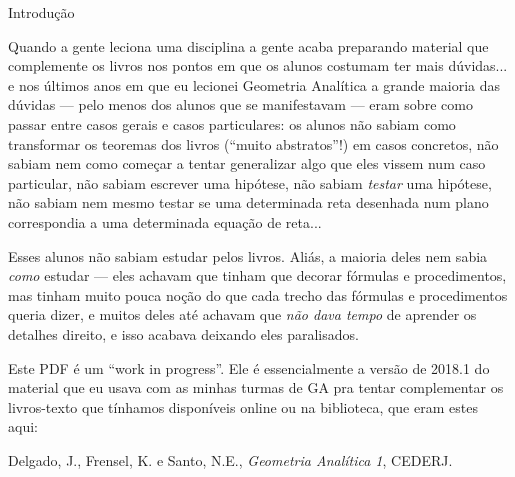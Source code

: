 \documentclass[oneside]{book}
\begin{document}
\newpage


%                                                      


 {Introdução}





Quando a gente leciona uma disciplina a gente acaba preparando
material que complemente os livros nos pontos em que os alunos
costumam ter mais dúvidas... e nos últimos anos em que eu lecionei
Geometria Analítica a grande maioria das dúvidas --- pelo menos dos
alunos que se manifestavam --- eram sobre como passar entre casos
gerais e casos particulares: os alunos não sabiam como transformar os
teoremas dos livros (``muito abstratos''!) em casos concretos, não
sabiam nem como começar a tentar generalizar algo que eles vissem num
caso particular, não sabiam escrever uma hipótese, não sabiam {\sl
  testar} uma hipótese, não sabiam nem mesmo testar se uma determinada
reta desenhada num plano correspondia a uma determinada equação de
reta...

Esses alunos não sabiam estudar pelos livros. Aliás, a maioria deles
nem sabia {\sl como} estudar --- eles achavam que tinham que decorar
fórmulas e procedimentos, mas tinham muito pouca noção do que cada
trecho das fórmulas e procedimentos queria dizer, e muitos deles até
achavam que {\sl não dava tempo} de aprender os detalhes direito, e
isso acabava deixando eles paralisados.

\msk

Este PDF é um ``work in progress''. Ele é essencialmente a versão de
2018.1 do material que eu usava com as minhas turmas de GA pra tentar
complementar os livros-texto que tínhamos disponíveis online ou na
biblioteca, que eram estes aqui:

\msk

Delgado, J., Frensel, K. e Santo, N.E., {\sl Geometria Analítica 1}, CEDERJ.
\end{document}
